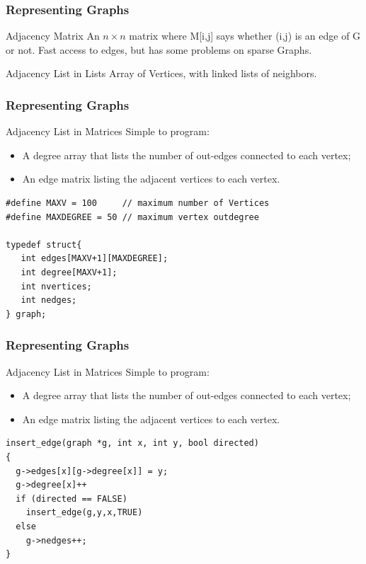 \documentclass{beamer}
\begin{document}
\begin{frame}
  \frametitle{Representing Graphs}
  \begin{block}{Adjacency Matrix}
      An $n \times n$ matrix where M[i,j] says whether (i,j) is an
      edge of G or not. Fast access to edges, but has some problems
      on sparse Graphs.
  \end{block}
  \begin{block}{Adjacency List in Lists}
    Array of Vertices, with linked lists of neighbors.
  \end{block}
\end{frame}

\begin{frame}
  \frametitle{Representing Graphs}
  \begin{block}{Adjacency List in Matrices}
    Simple to program:
    \begin{itemize}
    \item A degree array that lists the number of out-edges connected to each vertex;
    \item An edge matrix listing the adjacent vertices to each vertex.
    \end{itemize}
  \end{block}
  \medskip
  {\smaller
\begin{verbatim}
#define MAXV = 100     // maximum number of Vertices
#define MAXDEGREE = 50 // maximum vertex outdegree

typedef struct{
   int edges[MAXV+1][MAXDEGREE];
   int degree[MAXV+1];
   int nvertices;
   int nedges;
} graph;
\end{verbatim}
  } 
\end{frame}

\begin{frame}
  \frametitle{Representing Graphs}
  \begin{block}{Adjacency List in Matrices}
    Simple to program:
    \begin{itemize}
    \item A degree array that lists the number of out-edges connected to each vertex;
    \item An edge matrix listing the adjacent vertices to each vertex.
    \end{itemize}
  \end{block}
  \medskip
  {\smaller
\begin{verbatim}
insert_edge(graph *g, int x, int y, bool directed)
{
  g->edges[x][g->degree[x]] = y;
  g->degree[x]++
  if (directed == FALSE)
    insert_edge(g,y,x,TRUE)
  else
    g->nedges++;
}
\end{verbatim}
  } 
\end{frame}
\end{document}
